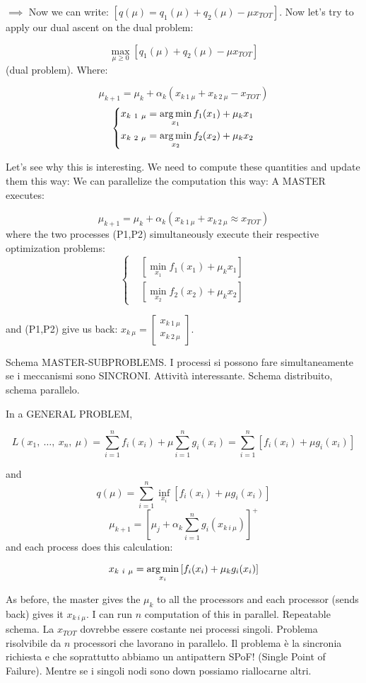 $\implies$ Now we can write: $[q(\mu) = q_1(\mu) + q_2(\mu) -\mu x_{TOT}]$. Now let's try to apply our dual ascent on the dual problem:

\[
	\max_{\mu\geq 0}{[q_1(\mu) + q_2(\mu) -\mu x_{TOT}]}
\]
(dual problem). Where:

\[
	\mu_{k+1} = \mu_k +\alpha_k(x_{k\ 1\ \mu} + x_{k\ 2\ \mu} - x_{TOT})
\]
\[
	\left\{
	\begin{aligned}
	&x_{k\ 1\ \mu} = \operatorname*{arg\,min}_{x_1}{f_1(x_1) + \mu_kx_1}\\
	&x_{k\ 2\ \mu} = \operatorname*{arg\,min}_{x_2}{f_2(x_2) + \mu_kx_2}
	\end{aligned}
	\right.
\]

Let's see why this is interesting. We need to compute these quantities and update them this way:
We can parallelize the computation this way:
A MASTER executes:

\[
	\mu_{k+1} = \mu_k +\alpha_k(x_{k\ 1\ \mu} + x_{k\ 2\ \mu} \approx x_{TOT})
\]
where the two processes (P1,P2) simultaneously execute their respective optimization problems: 
\[
	\left\{
	\begin{aligned}
	&[\min_{x_1}{f_1(x_1)+\mu_kx_1}]\\
	&[\min_{x_2}{f_2(x_2)+\mu_kx_2}]
	\end{aligned}
	\right.
\]

and (P1,P2) give us back: $x_{k\ \mu} = \begin{bmatrix}x_{k\ 1\ \mu}\\x_{k\ 2\ \mu}\end{bmatrix}$.

Schema MASTER-SUBPROBLEMS. I processi si possono fare simultaneamente se i meccanismi sono SINCRONI. Attività interessante. Schema distribuito, schema parallelo.

In a GENERAL PROBLEM,

\[
	L(x_1,\ \dots,\ x_n,\ \mu) = \sum_{i=1}^n{f_i(x_i)} + \mu\sum_{i=1}^n{g_i(x_i)} = \sum_{i=1}^n{[f_i(x_i)+\mu g_i(x_i)]}
\]

and
\[
	q(\mu) = \sum_{i=1}^n{\inf_{x_i}{[f_i(x_i)+\mu g_i(x_i)]}}
\]
\[
	\mu_{k+1} = [\mu_j + \alpha_k\sum_{i=1}^n{g_i(x_{k\ i\ \mu})}]^+
\]
and each process does this calculation:

\[
	x_{k\ i\ \mu} = \operatorname*{arg\,min}_{x_i}{[f_i(x_i)+\mu_kg_i(x_i)]}
\]

As before, the master gives the $\mu_k$ to all the processors and each processor (sends back) gives it $x_{k\ i\ \mu}$. I can run $n$ computation of this in parallel. Repeatable schema. La $x_{TOT}$ dovrebbe essere costante nei processi singoli. Problema risolvibile da $n$ processori che lavorano in parallelo. Il problema è la sincronia richiesta e che soprattutto abbiamo un antipattern SPoF! (Single Point of Failure). Mentre se i singoli nodi sono down possiamo riallocarne altri.

